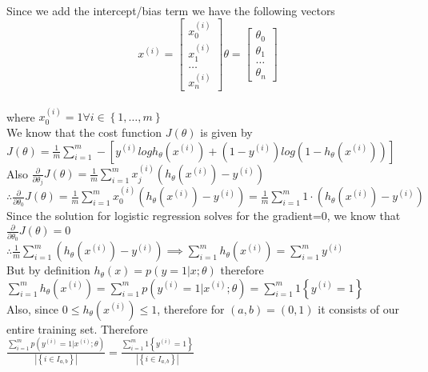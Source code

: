 \begin{answer}\\
Since we add the intercept/bias term we have the following vectors\\
\[
x^{(i)}=
\begin{bmatrix}
    x_{0}^{(i)}\\
    x_{1}^{(i)}\\
    \dots\\
    x_{n}^{(i)}
\end{bmatrix} \theta=
 \begin{bmatrix}
    \theta_{0}\\
    \theta_{1}\\
    \dots\\
    \theta_{n}
\end{bmatrix}
\]\\
where $x_0^{(i)}=1 \forall i \in \left\lbrace 1, \dots ,m \right\rbrace $\\
We know that the cost function $J(\theta)$ is given by\\
$J(\theta)=\frac{1}{m}\sum_{i=1}^{m}-[y^{(i)}logh_{\theta}(x^{(i)})+(1-y^{(i)})log(1-h_{\theta}(x^{(i)}))]$\\
Also $\frac{\partial}{\partial \theta_j}J(\theta)=\frac{1}{m}\sum_{i=1}^{m}x_j^{(i)}(h_{\theta}(x^{(i)})-y^{(i)})$\\
$\therefore \frac{\partial}{\partial \theta_0}J(\theta)=\frac{1}{m}\sum_{i=1}^{m}x_0^{(i)}(h_{\theta}(x^{(i)})-y^{(i)})=\frac{1}{m}\sum_{i=1}^{m}1 \cdot (h_{\theta}(x^{(i)})-y^{(i)})$\\
Since the solution for logistic regression solves for the gradient=0, we know that $\frac{\partial}{\partial \theta_0}J(\theta)=0$\\
$\therefore \frac{1}{m}\sum_{i=1}^{m}(h_{\theta}(x^{(i)})-y^{(i)}) \implies \sum_{i=1}^{m}h_{\theta}(x^{(i)})=\sum_{i=1}^{m}y^{(i)}$\\
But by definition $h_{\theta}(x)=p(y=1|x;\theta)$ therefore $\sum_{i=1}^{m}h_{\theta}(x^{(i)})=\sum_{i=1}^{m}p(y^{(i)}=1|x^{(i)};\theta)=\sum_{i=1}^{m}1\left\lbrace y^{(i)}=1 \right\rbrace$\\
Also, since $0 \leq h_{\theta}(x^{(i)}) \leq 1$, therefore for $(a,b)=(0,1)$ it consists of our entire training set. Therefore\\
$\frac{\sum_{i=1}^{m}p(y^{(i)}=1|x^{(i)};\theta)}{|\left\lbrace i \in I_{a,b}\right\rbrace|}=\frac{\sum_{i=1}^{m}1 \left\lbrace y^{(i)}=1\right\rbrace}{|\left\lbrace i \in I_{a,b}\right\rbrace|}$\\
\end{answer}
